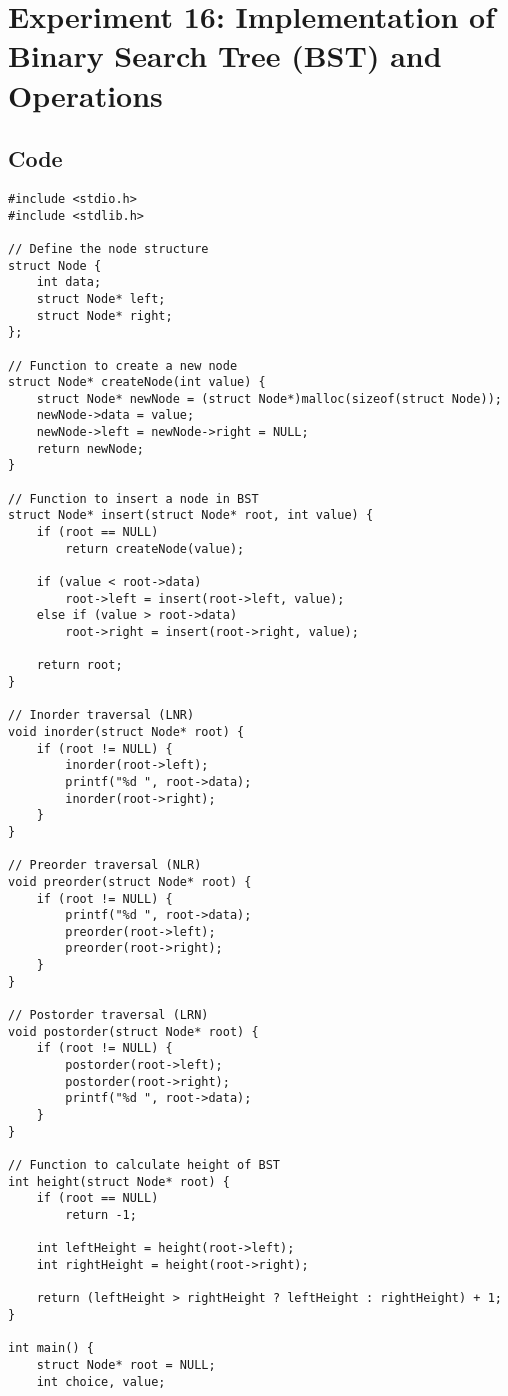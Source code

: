 \documentclass[12pt,a4paper]{article}
\begin{document}
\newpage
\section*{Experiment 16: Implementation of Binary Search Tree (BST) and Operations}

\subsection*{Code}
\begin{lstlisting}
#include <stdio.h>
#include <stdlib.h>

// Define the node structure
struct Node {
    int data;
    struct Node* left;
    struct Node* right;
};

// Function to create a new node
struct Node* createNode(int value) {
    struct Node* newNode = (struct Node*)malloc(sizeof(struct Node));
    newNode->data = value;
    newNode->left = newNode->right = NULL;
    return newNode;
}

// Function to insert a node in BST
struct Node* insert(struct Node* root, int value) {
    if (root == NULL)
        return createNode(value);

    if (value < root->data)
        root->left = insert(root->left, value);
    else if (value > root->data)
        root->right = insert(root->right, value);

    return root;
}

// Inorder traversal (LNR)
void inorder(struct Node* root) {
    if (root != NULL) {
        inorder(root->left);
        printf("%d ", root->data);
        inorder(root->right);
    }
}

// Preorder traversal (NLR)
void preorder(struct Node* root) {
    if (root != NULL) {
        printf("%d ", root->data);
        preorder(root->left);
        preorder(root->right);
    }
}

// Postorder traversal (LRN)
void postorder(struct Node* root) {
    if (root != NULL) {
        postorder(root->left);
        postorder(root->right);
        printf("%d ", root->data);
    }
}

// Function to calculate height of BST
int height(struct Node* root) {
    if (root == NULL)
        return -1;

    int leftHeight = height(root->left);
    int rightHeight = height(root->right);

    return (leftHeight > rightHeight ? leftHeight : rightHeight) + 1;
}

int main() {
    struct Node* root = NULL;
    int choice, value;


\end{lstlisting}
\end{document}
